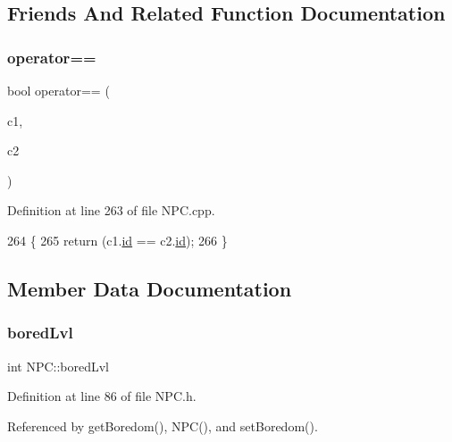 \subsection{Friends And Related Function Documentation}
\mbox{\label{class_n_p_c_a3e1f9defd10ab4be568a190fbcd0ac07}} 
\subsubsection{\texorpdfstring{operator==}{operator==}}
{\footnotesize\ttfamily bool operator== (\begin{DoxyParamCaption}\item[{const \hyperlink{class_n_p_c}{N\+PC} \&}]{c1,  }\item[{const \hyperlink{class_n_p_c}{N\+PC} \&}]{c2 }\end{DoxyParamCaption})\hspace{0.3cm}{\ttfamily [friend]}}



Definition at line 263 of file N\+P\+C.\+cpp.


\begin{DoxyCode}
264 \{
265     \textcolor{keywordflow}{return} (c1.\hyperlink{class_n_p_c_a1b705223f885df652f2faffc4735d03c}{id} == c2.\hyperlink{class_n_p_c_a1b705223f885df652f2faffc4735d03c}{id});
266 \}
\end{DoxyCode}


\subsection{Member Data Documentation}
\mbox{\label{class_n_p_c_a1f67b7dfca770653fc523dfc558e7fdf}} 
\subsubsection{\texorpdfstring{bored\+Lvl}{boredLvl}}
{\footnotesize\ttfamily int N\+P\+C\+::bored\+Lvl\hspace{0.3cm}{\ttfamily [private]}}



Definition at line 86 of file N\+P\+C.\+h.



Referenced by get\+Boredom(), N\+P\+C(), and set\+Boredom().

